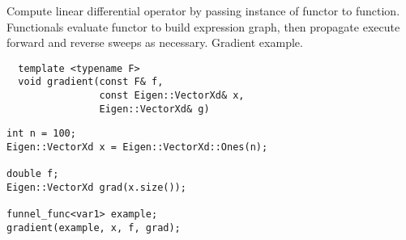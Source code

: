 Compute linear differential operator by
passing instance of functor to function.  Functionals
evaluate functor to build expression graph, then
propagate execute forward and reverse sweeps
as necessary.  Gradient example.
%
\begin{verbatim}
  template <typename F>
  void gradient(const F& f,
                const Eigen::VectorXd& x,
                Eigen::VectorXd& g)
\end{verbatim}

\begin{verbatim}
int n = 100;
Eigen::VectorXd x = Eigen::VectorXd::Ones(n);
  
double f;
Eigen::VectorXd grad(x.size());
  
funnel_func<var1> example;
gradient(example, x, f, grad);
\end{verbatim}
